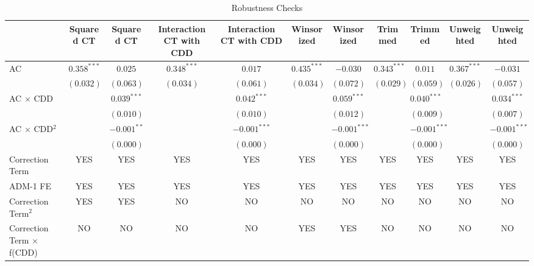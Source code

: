 
\begin{table}[H]
\caption{Robustness Checks}
\begin{center}
\begin{tabular}{l c c c c c c c c c c}
\hline
 & Squared CT & Squared CT & Interaction CT with CDD & Interaction CT with CDD & Winsorized & Winsorized & Trimmed & Trimmed & Unweighted & Unweighted \\
\hline
AC                              & $0.358^{***}$ & $0.025$       & $0.348^{***}$ & $0.017$        & $0.435^{***}$ & $-0.030$       & $0.343^{***}$ & $0.011$        & $0.367^{***}$ & $-0.031$       \\
                                & $(0.032)$     & $(0.063)$     & $(0.034)$     & $(0.061)$      & $(0.034)$     & $(0.072)$      & $(0.029)$     & $(0.059)$      & $(0.026)$     & $(0.057)$      \\
AC $\times$ CDD                 &               & $0.039^{***}$ &               & $0.042^{***}$  &               & $0.059^{***}$  &               & $0.040^{***}$  &               & $0.034^{***}$  \\
                                &               & $(0.010)$     &               & $(0.010)$      &               & $(0.012)$      &               & $(0.009)$      &               & $(0.007)$      \\
AC $\times$ CDD$^2$             &               & $-0.001^{**}$ &               & $-0.001^{***}$ &               & $-0.001^{***}$ &               & $-0.001^{***}$ &               & $-0.001^{***}$ \\
                                &               & $(0.000)$     &               & $(0.000)$      &               & $(0.000)$      &               & $(0.000)$      &               & $(0.000)$      \\
\hline
Correction Term                 & YES           & YES           & YES           & YES            & YES           & YES            & YES           & YES            & YES           & YES            \\
ADM-1 FE                        & YES           & YES           & YES           & YES            & YES           & YES            & YES           & YES            & YES           & YES            \\
Correction Term$^2$             & YES           & YES           & NO            & NO             & NO            & NO             & NO            & NO             & NO            & NO             \\
Correction Term $\times$ f(CDD) & NO            & NO            & NO            & NO             & YES           & YES            & NO            & NO             & NO            & NO             \\

\end{tabular}
\end{center}
\end{table}
